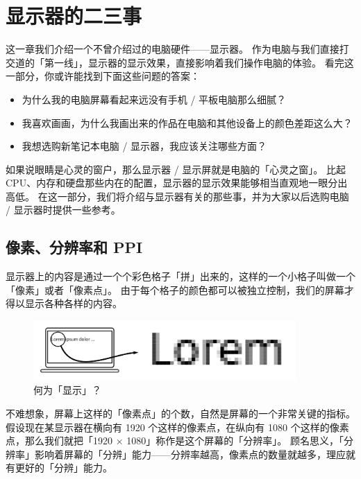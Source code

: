 \chapter{显示器的二三事}
\label{screens-and-their-secrets}

\begin{intro}
  这一章我们介绍一个不曾介绍过的电脑硬件——显示器。
  作为电脑与我们直接打交道的「第一线」，显示器的显示效果，直接影响着我们操作电脑的体验。
  看完这一部分，你或许能找到下面这些问题的答案：
  \begin{itemize}
    \item 为什么我的电脑屏幕看起来远没有手机 / 平板电脑那么细腻？
    \item 我喜欢画画，为什么我画出来的作品在电脑和其他设备上的颜色差距这么大？
    \item 我想选购新笔记本电脑 / 显示器，我应该关注哪些方面？
  \end{itemize}
\end{intro}

如果说眼睛是心灵的窗户，那么显示器 / 显示屏就是电脑的「心灵之窗」。
比起 CPU、内存和硬盘那些内在的配置，显示器的显示效果能够相当直观地一眼分出高低。
在这一部分，我们将介绍与显示器有关的那些事，并为大家以后选购电脑 / 显示器时提供一些参考。

\section{像素、分辨率和 PPI}

显示器上的内容是通过一个个彩色格子「拼」出来的，这样的一个小格子叫做一个「像素」或者「像素点」。
由于每个格子的颜色都可以被独立控制，我们的屏幕才得以显示各种各样的内容。

\begin{figure}[htb!]
  \centering
  \includegraphics[width=10cm]{assets/Display.png}
  \caption{何为「显示」？}
  \label{Display}
\end{figure}

不难想象，屏幕上这样的「像素点」的个数，自然是屏幕的一个非常关键的指标。
假设现在某显示器在横向有 1920 个这样的像素点，在纵向有 1080 个这样的像素点，那么我们就把「1920 × 1080」称作是这个屏幕的「分辨率」。
顾名思义，「分辨率」影响着屏幕的「分辨」能力——分辨率越高，像素点的数量就越多，理应就有更好的「分辨」能力。


